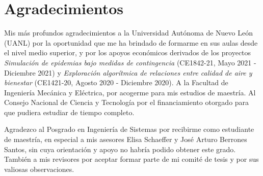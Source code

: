 
\chapter{Agradecimientos}

Mis más profundos agradecimientos a la Universidad Autónoma de Nuevo León (UANL) por la oportunidad que me ha brindado de formarme en sus aulas desde el nivel medio superior, y por los apoyos económicos derivados de los proyectos \textit{Simulación de epidemias bajo medidas de contingencia} (CE1842-21, Mayo 2021 - Diciembre 2021) y \textit{Exploración algorítmica de relaciones entre calidad de aire y bienestar} (CE1421-20, Agosto 2020 - Diciembre 2020). A la Facultad de Ingeniería Mecánica y Eléctrica, por acogerme para mis estudios de maestría. Al Consejo Nacional de Ciencia y Tecnología por el financiamiento otorgado para que pudiera estudiar de tiempo completo.

Agradezco al Posgrado en Ingeniería de Sistemas por recibirme como estudiante de maestría, en especial a mis asesores Elisa Schaeffer y José Arturo Berrones Santos, sin cuya orientación y apoyo no habría podido obtener este grado. También a mis revisores por aceptar formar parte de mi comité de tesis y por sus valiosas observaciones.